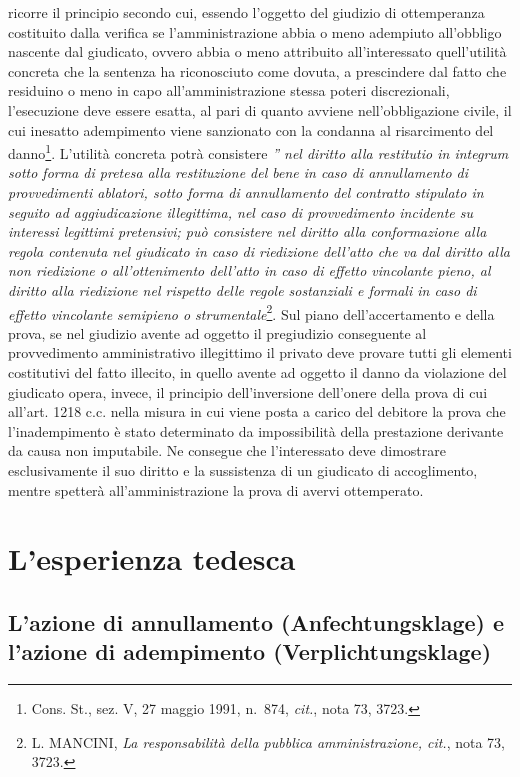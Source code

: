\documentclass[12pt,it,a4paper,]{report}
\begin{document}
ricorre il principio secondo cui, essendo l'oggetto del giudizio di
ottemperanza costituito dalla verifica se l'amministrazione abbia o meno
adempiuto all'obbligo nascente dal giudicato, ovvero abbia o meno
attribuito all'interessato quell'utilità concreta che la sentenza ha
riconosciuto come dovuta, a prescindere dal fatto che residuino o meno
in capo all'amministrazione stessa poteri discrezionali, l'esecuzione
deve essere esatta, al pari di quanto avviene nell'obbligazione civile,
il cui inesatto adempimento viene sanzionato con la condanna al
risarcimento del danno\footnote{Cons. St., sez. V, 27 maggio 1991,
  n.~874, \emph{cit.}, nota 73, 3723.}. L'utilità concreta potrà
consistere \emph{'' nel diritto alla restitutio in integrum sotto forma
di pretesa alla restituzione del bene in caso di annullamento di
provvedimenti ablatori, sotto forma di annullamento del contratto
stipulato in seguito ad aggiudicazione illegittima, nel caso di
provvedimento incidente su interessi legittimi pretensivi; può
consistere nel diritto alla conformazione alla regola contenuta nel
giudicato in caso di riedizione dell'atto che va dal diritto alla non
riedizione o all'ottenimento dell'atto in caso di effetto vincolante
pieno, al diritto alla riedizione nel rispetto delle regole sostanziali
e formali in caso di effetto vincolante semipieno o
strumentale}\footnote{L. MANCINI, \emph{La responsabilità della pubblica
  amministrazione, cit.}, nota 73, 3723.}. Sul piano dell'accertamento e
della prova, se nel giudizio avente ad oggetto il pregiudizio
conseguente al provvedimento amministrativo illegittimo il privato deve
provare tutti gli elementi costitutivi del fatto illecito, in quello
avente ad oggetto il danno da violazione del giudicato opera, invece, il
principio dell'inversione dell'onere della prova di cui all'art. 1218
c.c. nella misura in cui viene posta a carico del debitore la prova che
l'inadempimento è stato determinato da impossibilità della prestazione
derivante da causa non imputabile. Ne consegue che l'interessato deve
dimostrare esclusivamente il suo diritto e la sussistenza di un
giudicato di accoglimento, mentre spetterà all'amministrazione la prova
di avervi ottemperato.

\hypertarget{lesperienza-tedesca}{%
\chapter{L'esperienza tedesca}\label{lesperienza-tedesca}}

\hypertarget{lazione-di-annullamento-anfechtungsklage-e-lazione-di-adempimento-verplichtungsklage}{%
\section{L'azione di annullamento (Anfechtungsklage) e l'azione di
adempimento
(Verplichtungsklage)}\label{lazione-di-annullamento-anfechtungsklage-e-lazione-di-adempimento-verplichtungsklage}}
\end{document}
